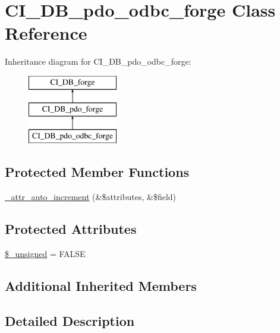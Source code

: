 \hypertarget{class_c_i___d_b__pdo__odbc__forge}{}\section{C\+I\+\_\+\+D\+B\+\_\+pdo\+\_\+odbc\+\_\+forge Class Reference}
\label{class_c_i___d_b__pdo__odbc__forge}
Inheritance diagram for C\+I\+\_\+\+D\+B\+\_\+pdo\+\_\+odbc\+\_\+forge\+:\begin{figure}[H]
\begin{center}
\leavevmode
\includegraphics[height=3.000000cm]{class_c_i___d_b__pdo__odbc__forge}
\end{center}
\end{figure}
\subsection*{Protected Member Functions}
\begin{DoxyCompactItemize}
\item 
\mbox{\hyperlink{class_c_i___d_b__pdo__odbc__forge_a2a013a5932439c3c44f0dad3436525f7}{\+\_\+attr\+\_\+auto\+\_\+increment}} (\&\$attributes, \&\$field)
\end{DoxyCompactItemize}
\subsection*{Protected Attributes}
\begin{DoxyCompactItemize}
\item 
\mbox{\hyperlink{class_c_i___d_b__pdo__odbc__forge_aae977ae6d61fa183f0b25422b6ddc31c}{\$\+\_\+unsigned}} = F\+A\+L\+SE
\end{DoxyCompactItemize}
\subsection*{Additional Inherited Members}


\subsection{Detailed Description}


